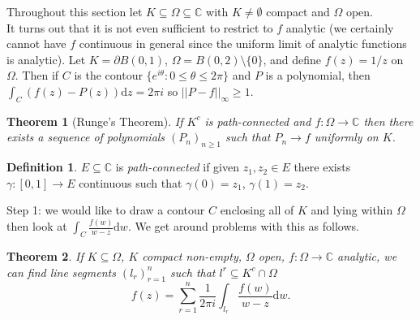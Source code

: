 \documentclass[a4paper, 10pt, twocolumn]{amsart}
\newtheorem*{theorem}{Theorem}
\theoremstyle{definition}
\newtheorem*{definition}{Definition}
\newcommand{\bb}[1]{\mathbb{#1}}
\newcommand{\sbs}[0]{\subseteq}
\newcommand{\1}{\mathbbm{1}}
\begin{document}
Throughout this section let $K \sbs \Omega \sbs \bb{C}$ with $K\ne \emptyset$ compact and $\Omega$ open.\\

It turns out that it is not even sufficient to restrict to $f$ analytic (we certainly cannot have $f$ continuous in general since the uniform limit of analytic functions is analytic). Let $K = \partial B(0,1)$, $\Omega = B(0,2)\setminus\{0\}$, and define $f(z) = 1/z$ on $\Omega$. Then if $C$ is the contour $\{e^{i\theta}: 0\le \theta\le 2\pi\}$ and $P$ is a polynomial, then $\int_C (f(z)-P(z))\mathrm{d}z = 2\pi i$ so $||P-f||_\infty \ge 1$.

\begin{theorem}[Runge's Theorem]
    If $K^c$ is path-connected and $f: \Omega \to \bb{C}$ then there exists a sequence of polynomials $(P_n)_{n\ge 1}$ such that $P_n \to f$ uniformly on $K$. 
\end{theorem}

\begin{definition}
    $E \sbs \bb{C}$ is \textit{path-connected} if given $z_1,z_2 \in E$ there exists $\gamma:[0,1]\to E$ continuous such that $\gamma(0) = z_1$, $\gamma(1) = z_2$. 
\end{definition}

Step 1: we would like to draw a contour $C$ enclosing all of $K$ and lying within $\Omega$ then look at $\int_C \frac{f(w)}{w-z} \mathrm{d}w$. We get around problems with this as follows.

\begin{theorem}
    If $K \sbs \Omega$, $K$ compact non-empty, $\Omega$ open, $f: \Omega \to \bb{C}$ analytic, we can find line segments $(l_r)_{r=1}^n$ such that $l^r \sbs K^c \cap \Omega$ \[f(z) = \sum_{r=1}^n \frac{1}{2\pi i} \int_{l_r} \frac{f(w)}{w-z}\mathrm{d}w.\]
\end{theorem}
\end{document}
